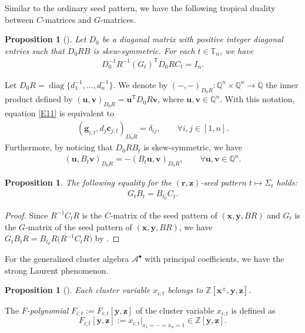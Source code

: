 \documentclass[10pt,a4paper]{amsart}
\numberwithin{equation}{section}
\newtheorem{Proposition}[Theorem]{Proposition}
 { \theoremstyle{definition}
\newtheorem{Definition}[Theorem]{Definition}
\newtheorem{Note}[Theorem]{Note}
\newtheorem{Example}[Theorem]{Example}
\newtheorem{Remark}[Theorem]{Remark} }
\begin{document}
Similar to the ordinary seed pattern, we have the following tropical duality between $C$-matrices and $G$-matrices.
\begin{Proposition}[{\cite[Proposition 3.21]{Nakanishi14}}]\label{P4}
 Let $D_0$ be a diagonal matrix with positive integer diagonal entries such that $D_0RB$ is skew-symmetric. For each $t\in \mathbb{T}_n$, we have
\begin{align}\label{E11}
D_0^{-1}R^{-1}(G_t)^{\mathsf T}D_0RC_t=I_n.
\end{align}
\end{Proposition}
Let $D_0R=\operatorname{diag}\bigl\{d_1^{-1},\dots, d_n^{-1}\bigr\}$. We denote by $(-,-)_{D_0R}\colon \mathbb{Q}^n\times \mathbb{Q}^n\to \mathbb{Q}$ the inner product defined by $(\mathbf{u},\mathbf{v})_{D_0R}=\mathbf{u}^{\mathsf T}D_0R\mathbf{v}$, where $\mathbf{u},\mathbf{v}\in \mathbb{Q}^n$. With this notation, equation \eqref{E11} is equivalent to
\begin{align}\label{E12}
 (\mathbf{g}_{i;t},d_j\mathbf{c}_{j:t})_{D_0R}=\delta_{ij},\qquad \forall i,j\in[1,n].
\end{align}
Furthermore, by noticing that $D_0RB_t$ is skew-symmetric, we have
\begin{align*}
 (\mathbf{u},B_t\mathbf{v})_{D_0R}=-(B_t\mathbf{u},\mathbf{v})_{D_0R},\qquad \forall  \mathbf{u},\mathbf{v}\in \mathbb{Q}^n.
\end{align*}

\begin{Proposition}\label{P5}
 The following equality for the $(\mathbf{r},\mathbf{z})$-seed pattern $t\mapsto \Sigma_t$ holds:
 \begin{align}\label{E14}
 G_tB_t=B_{t_0}C_t.
 \end{align}
\end{Proposition}
\begin{proof}
Since $R^{-1}C_tR$ is the $C$-matrix of the seed pattern of $(\mathbf{x},\mathbf{y}, BR)$ and $G_t$ is the $G$-matrix of the seed pattern of $(\mathbf{x},\mathbf{y}, BR)$, we have
$
G_tB_tR=B_{t_0}R\bigl(R^{-1}C_tR\bigr)
$
by \cite[equation~(6.14)]{fomin_zelevinsky_2007}.
\end{proof}

For the generalized cluster algebra $\mathcal{A}^\bullet$ with principal coefficients, we have the strong Laurent phenomenon.
\begin{Proposition}[{\cite[Proposition 3.3]{Nakanishi14}}]
 Each cluster variable $x_{i;t}$ belongs to $\mathbb{Z}[\mathbf{x}^\pm,\mathbf{y},\mathbf{z}]$.
\end{Proposition}
\begin{Definition}
 The {\it $F$-polynomial} $F_{i;t}:=F_{i;t}[\mathbf{y},\mathbf{z}]$ of the cluster variable $x_{i;t}$ is defined as
 \[
 F_{i;t}[\mathbf{y},\mathbf{z}]:=x_{i;t}|_{x_1=\cdots=x_n=1}\in \mathbb{Z}[\mathbf{y},\mathbf{z}].
 \]
\end{Definition}
\end{document}
